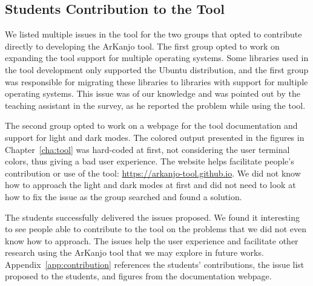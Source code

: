 \subsection{Students Contribution to the Tool}

We listed multiple issues in the tool for the two groups that opted to contribute directly 
to developing the ArKanjo tool. The first group opted to work on expanding the tool support 
for multiple operating systems. Some libraries used in the tool development only supported the 
Ubuntu distribution, and the first group was responsible for migrating these libraries to 
libraries with support for multiple operating systems. This issue was of our knowledge and 
was pointed out by the teaching assistant in the survey, as he reported the problem while 
using the tool.

The second group opted to work on a webpage for the tool documentation and support for 
light and dark modes. The colored output presented in the figures in Chapter~\ref{cha:tool} was 
hard-coded at first, not considering the user terminal colors, thus giving a bad user experience. 
The website helps facilitate people's contribution or use of the tool: \url{https://arkanjo-tool.github.io}. We did not know how to 
approach the light and dark modes at first and did not need to look at how to fix the issue as 
the group searched and found a solution.

The students successfully delivered the issues proposed. We found it interesting to see 
people able to contribute to the tool on the problems that we did not even know how to approach.
The issues help the user experience and facilitate other research using the ArKanjo tool that 
we may explore in future works. Appendix~\ref{app:contribution} references the 
students' contributions, the issue list proposed to the students, and figures from 
the documentation webpage.
